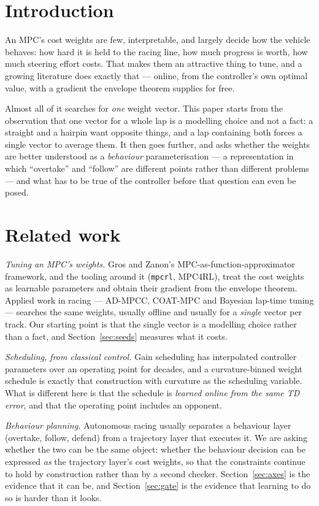 \documentclass[letterpaper, 10 pt, conference]{ieeeconf}
\begin{document}
\section{Introduction}
An MPC's cost weights are few, interpretable, and largely decide how the
vehicle behaves: how hard it is held to the racing line, how much progress is
worth, how much steering effort costs. That makes them an attractive thing to
tune, and a growing literature does exactly that --- online, from the
controller's own optimal value, with a gradient the envelope theorem supplies
for free.

Almost all of it searches for \emph{one} weight vector. This paper starts from
the observation that one vector for a whole lap is a modelling choice and not a
fact: a straight and a hairpin want opposite things, and a lap containing both
forces a single vector to average them. It then goes further, and asks whether
the weights are better understood as a \emph{behaviour} parameterisation --- a
representation in which ``overtake'' and ``follow'' are different points rather
than different problems --- and what has to be true of the controller before
that question can even be posed.

\section{Related work}
\emph{Tuning an MPC's weights.} Gros and Zanon's MPC-as-function-approximator
framework, and the tooling around it (\texttt{mpcrl}, MPC4RL), treat the cost
weights as learnable parameters and obtain their gradient from the envelope
theorem. Applied work in racing --- AD-MPCC, COAT-MPC and Bayesian lap-time
tuning --- searches the same weights, usually offline and usually for a
\emph{single} vector per track. Our starting point is that the single vector is
a modelling choice rather than a fact, and Section~\ref{sec:seeds} measures what
it costs.

\emph{Scheduling, from classical control.} Gain scheduling has interpolated
controller parameters over an operating point for decades, and a curvature-binned
weight schedule is exactly that construction with curvature as the scheduling
variable. What is different here is that the schedule is \emph{learned online
from the same TD error}, and that the operating point includes an opponent.

\emph{Behaviour planning.} Autonomous racing usually separates a behaviour layer
(overtake, follow, defend) from a trajectory layer that executes it. We are
asking whether the two can be the same object: whether the behaviour decision
can be expressed \emph{as} the trajectory layer's cost weights, so that the
constraints continue to hold by construction rather than by a second checker.
Section~\ref{sec:axes} is the evidence that it can be, and
Section~\ref{sec:gate} is the evidence that learning to do so is harder than it
looks.
\end{document}
